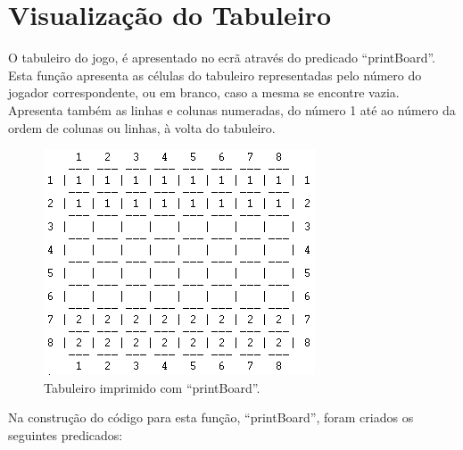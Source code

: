 \documentclass[15pt,a4paper]{article}
\begin{document}

\section{Visualização do Tabuleiro}


O tabuleiro do jogo, é apresentado no ecrã através do predicado ``printBoard''.
Esta função apresenta as células do tabuleiro representadas pelo número do jogador correspondente, ou em branco, caso a mesma se encontre vazia.
Apresenta também as linhas e colunas numeradas, do número 1 até ao número da ordem de colunas ou linhas, à volta do tabuleiro.

\begin{figure}[h!]
\begin{center}
\includegraphics[scale=1]{fig_tab.png}
\caption{Tabuleiro imprimido com ``printBoard''.}
\label{fig:3}
\end{center}
\end{figure}

Na construção do código para esta função, ``printBoard'', foram criados os seguintes predicados:
\end{document}
